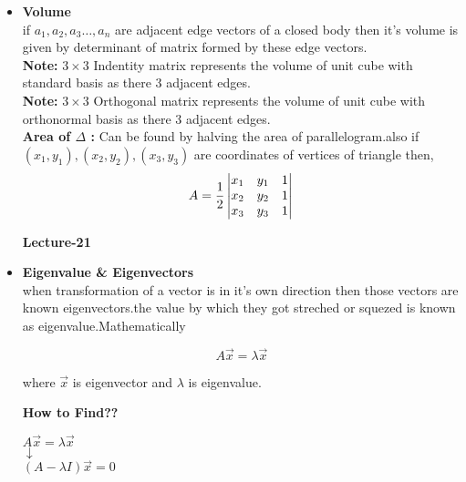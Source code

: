 \documentclass[a4paper,11pt]{article}
\numberwithin{equation}{section}
\begin{document}
\begin{itemize}
\item \textbf{Volume}\\

if $a_1,a_2,a_3\dots,a_n$ are adjacent edge vectors of a closed body then it's volume is given by determinant of matrix formed by these edge vectors.\\

\textbf{Note: }$3\times 3$ Indentity matrix represents the volume of unit cube with standard basis as there 3 adjacent edges.\\

\textbf{Note: }$3\times 3$ Orthogonal matrix represents the volume of unit cube with orthonormal basis as there 3 adjacent edges.\\

\textbf{Area of $\Delta$ :} Can be found by halving the area of parallelogram.also if $(x_1,y_1),(x_2,y_2),(x_3,y_3)$ are coordinates of vertices of triangle then,
\begin{equation}
    A=\frac{1}{2}\left|\begin{matrix}
        x_1&y_1&1\\    
        x_2&y_2&1\\  
        x_3&y_3&1\\  
        \end{matrix}\right|\\
\end{equation}

\begin{center}
    \Huge{\textbf{Lecture-21}}
\end{center}
\vspace{5pt}

\item \textbf{Eigenvalue \& Eigenvectors} \\
when transformation of a vector is in it's own direction then those vectors are known eigenvectors.the value by which they got streched or squezed is known as eigenvalue.Mathematically

\begin{equation}
    A\vec{x}=\lambda \vec{x}
\end{equation}

where $\vec{x}$ is eigenvector and $\lambda$ is eigenvalue.

\textbf{How to Find??}
\begin{center}
    $A\vec{x}=\lambda \vec{x}$\\
    $\downarrow$\\
    $(A-\lambda I)\vec{x}=0$
\end{center}


\end{itemize}
\end{document}
